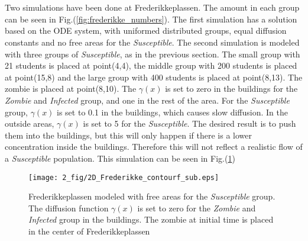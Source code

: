 \documentclass[%
twoside,                 %
final,                   %
chapterprefix=true,      %
open=right               %
10pt]{book}
\begin{document}
\\
\\
Two simulations have been done at Frederikkeplassen. The amount in each group can be seen in Fig.(\ref{fig:frederikke_numbers}). The first simulation has a solution based on the ODE system, with uniformed distributed groups, equal diffusion constants and no free areas for the \emph{Susceptible}. The second simulation is modeled with three groups of \emph{Susceptible}, as in the previous section. The small group with 21 students is placed at point(4,4), the middle group with 200 students is placed at point(15,8) and the large group with 400 students is placed at point(8,13). The zombie is placed at point(8,10). The $\gamma(x)$ is set to zero in the buildings for the \emph{Zombie} and \emph{Infected} group, and one in the rest of the area. For the \emph{Susceptible} group, $\gamma(x)$ is set to 0.1 in the buildings, which causes slow diffusion. In the outside areas, $\gamma(x)$ is set to 5 for the \emph{Susceptible}. The desired result is to push them into the buildings, but this will only happen if there is a lower concentration inside the buildings. Therefore this will not reflect a realistic flow of a \emph{Susceptible} population. This simulation can be seen in Fig.(\ref{fig:frederikke_free_area})  


\begin{figure}[ht]
  \centerline{\texttt{[image: 2\_fig/2D\_Frederikke\_contourf\_sub.eps]}}
  \caption{
  \label{fig:frederikke_free_area} Frederikkeplassen modeled with free areas for the \emph{Susceptible} group. The diffusion function $\gamma(x)$ is set to zero for the \emph{Zombie} and \emph{Infected} group in the buildings. The zombie at initial time is placed in the center of Frederikkeplassen
  }
\end{figure}
\end{document}
